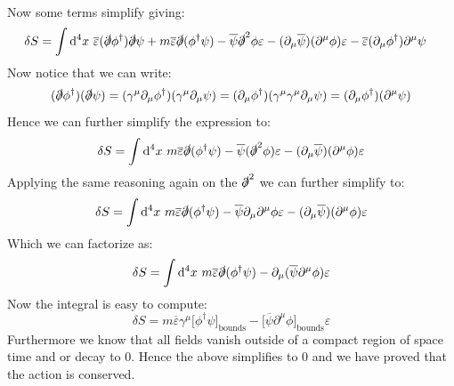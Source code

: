 \documentclass[10pt,a4paper]{article}
\begin{document}
\begin{enumerate}
\begin{align*}
\end{align*}
Now some terms simplify giving:
\begin{align*}
\delta S = \int \dd^4 x \,\, &\overline{\varepsilon}(\slashed{\partial} \phi^\dagger) \slashed{\partial} \psi + m \overline{\varepsilon} \slashed{\partial} (\phi^\dagger \psi) - \overline{\psi} \slashed{\partial}^2 \phi \varepsilon  - (\partial_\mu \overline{\psi})(\partial^\mu \phi) \varepsilon - \overline{\varepsilon} (\partial_\mu \phi^\dagger) \partial^\mu \psi
\end{align*}
Now notice that we can write:
\[
(\slashed{\partial} \phi^\dagger ) (\slashed{\partial} \psi) = (\gamma^\mu \partial_\mu \phi^\dagger)(\gamma^\mu \partial_\mu \psi) = (\partial_\mu \phi^\dagger)( \gamma^\mu \gamma^\mu \partial_\mu \psi) = (\partial_\mu \phi^\dagger)(\partial^\mu \psi)
\]
Hence we can further simplify the expression to:
\[
\delta S = \int \dd^4 x \,\, m \overline{\varepsilon} \slashed{\partial}( \phi^\dagger \psi) - \overline{\psi} (\slashed{\partial}^2 \phi) \varepsilon - (\partial_\mu \overline{\psi}) (\partial^\mu \phi)\varepsilon
\]
Applying the same reasoning again on the $\slashed{\partial}^2$ we can further simplify to:
\[
\delta S = \int \dd^4 x \,\, m \overline{\varepsilon} \slashed{\partial} (\phi^\dagger \psi) - \overline{\psi} \partial_\mu  \partial^\mu \phi \varepsilon - (\partial_\mu \overline{\psi}) (\partial^\mu \phi) \varepsilon
\]
Which we can factorize as:
\[
\delta S = \int \dd^4 x \,\, m \overline{\varepsilon} \slashed{\partial} (\phi^\dagger \psi) - \partial_\mu(\overline{\psi} \partial^\mu \phi) \varepsilon
\]
Now the integral is easy to compute:
\[
\delta S = m \overline{\varepsilon} \gamma^\mu \Big[\phi^\dagger \psi \Big]_{\mbox{bounds}} - \Big[ \overline{\psi} \partial^\mu \phi \Big]_{\mbox{bounds}} \varepsilon
\]
Furthermore we know that all fields vanish outside of a compact region of space time and or decay to 0. Hence the above simplifies to 0 and we have proved that the action is conserved.
\end{enumerate}
\end{document}
